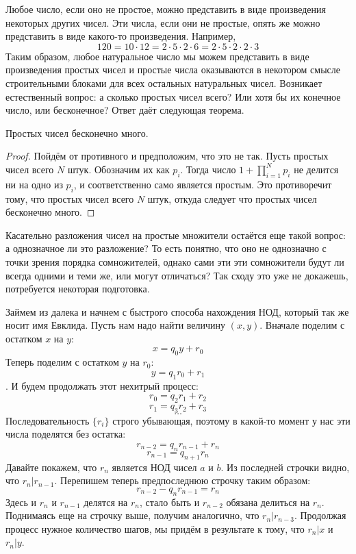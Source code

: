Любое число, если оно не простое, можно представить в виде произведения некоторых других чисел. Эти числа, если они не простые, опять же можно представить в виде какого-то произведения. Например,
$$120 = 10 \cdot 12 = 2\cdot 5 \cdot 2 \cdot 6 = 2\cdot 5 \cdot 2 \cdot 2 \cdot 3$$
Таким образом, любое натуральное число мы можем представить в виде произведения простых чисел и простые числа оказываются в некотором смысле строительными блоками для всех остальных натуральных чисел. Возникает естественный вопрос: а сколько простых чисел всего? Или хотя бы их конечное число, или бесконечное? Ответ даёт следующая теорема.

\begin{Euclids}
Простых чисел бесконечно много.
\end{Euclids}
\begin{proof}
Пойдём от противного и предположим, что это не так. Пусть простых чисел всего $N$ штук. Обозначим их как ${p_i}$. Тогда число $1 + \prod_{i=1}^N p_i$ не делится ни на одно из $p_i$, и соответственно само является простым. Это противоречит тому, что простых чисел всего $N$ штук, откуда следует что простых чисел бесконечно много.
\end{proof}

Касательно разложения чисел на простые множители остаётся еще такой вопрос: а однозначное ли это разложение? То есть понятно, что оно не однозначно с точки зрения порядка сомножителей, однако сами эти эти сомножители будут ли всегда одними и теми же, или могут отличаться? Так сходу это уже не докажешь, потребуется некоторая подготовка.

Займем из далека и начнем с быстрого способа нахождения НОД, который так же носит имя Евклида. Пусть нам надо найти величину $(x, y)$. Вначале поделим с остатком $x$ на $y$:
$$x = q_0 y + r_0$$
Теперь поделим с остатком $y$ на $r_0$:
$$y = q_1 r_0 + r_1$$.
И будем продолжать этот нехитрый процесс:
$$r_0 = q_2 r_1 + r_2$$
$$r_1 = q_3 r_2 + r_3$$
$$\dots$$
Последовательность $\{r_i\}$ строго убывающая, поэтому в какой-то момент у нас эти числа поделятся без остатка:
$$r_{n-2} = q_n r_{n-1} + r_n$$
$$r_{n-1} = q_{n+1} r_n$$
Давайте покажем, что $r_n$ является НОД чисел $a$ и $b$. Из последней строчки видно, что $r_n | r_{n-1}$. Перепишем теперь предпоследнюю строчку таким образом:
$$r_{n - 2} - q_n r_{n - 1} = r_n$$
Здесь и $r_n$ и $r_{n-1}$ делятся на $r_n$, стало быть и $r_{n-2}$ обязана делиться на $r_n$. Поднимаясь еще на строчку выше, получим аналогично, что $r_n|r_{n-3}$. Продолжая процесс нужное количество шагов, мы придём в результате к тому, что $r_n|x$ и $r_n|y$.

